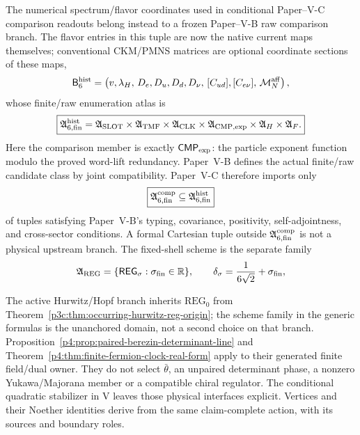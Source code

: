 \documentclass[12pt,a4paper]{article}
\newcommand{\REGsig}{\mathsf{REG}_{\sigma}}
\newcommand{\Brawsix}{\mathsf B_{6}^{\rm hist}}
\newcommand{\Arawsix}{\mathfrak A_{6,{\rm fin}}^{\rm hist}}
\newcommand{\Acompsix}{\mathfrak A_{6,{\rm fin}}^{\rm comp}}
\newcommand{\CMPexp}{\mathsf{CMP}_{\rm exp}}
\begin{document}
The numerical spectrum/flavor coordinates used in conditional Paper--V-C comparison readouts
belong instead to a frozen Paper--V-B raw comparison branch.  The flavor entries in this tuple are now the native current maps themselves; conventional CKM/PMNS matrices are optional coordinate sections of these maps,
\begin{equation}
\label{p7v2:eq:upstream-raw-branch}
\Brawsix
=
\left(
 v,\lambda_H,\,
 D_e,D_u,D_d,D_\nu,\,
 [C_{ud}],[C_{e\nu}],\,
 \mathcal M_N^{\rm aff}
\right),
\end{equation}
whose finite/raw enumeration atlas is
\begin{equation}
\label{p7v2:eq:paper6-selector-atlas}
\boxed{
\Arawsix
=
\mathfrak A_{\rm SLOT}
\times\mathfrak A_{\rm TMF}
\times\mathfrak A_{\rm CLK}
\times\mathfrak A_{\mathrm{CMP,exp}}
\times\mathfrak A_H
\times\mathfrak A_F.
}
\end{equation}
Here the comparison member is exactly \(\CMPexp\): the particle exponent
function modulo the proved word-lift redundancy.  Paper~V-B defines the actual
finite/raw candidate class by joint compatibility.  Paper~V-C therefore
imports only
\begin{equation}
\boxed{\Acompsix\subseteq\Arawsix}
\end{equation}
of tuples satisfying Paper~V-B's typing, covariance, positivity,
self-adjointness, and cross-sector conditions.  A formal Cartesian tuple
outside \(\Acompsix\) is not a physical upstream branch.  The fixed-shell
scheme is the separate family
\begin{equation}
\label{p7v2:eq:reg-family-import}
\mathfrak A_{\rm REG}
=
\{\REGsig:\sigma_{\rm fin}\in\mathbb R\},
\qquad
\delta_\sigma
=
\frac1{6\sqrt2}+\sigma_{\rm fin},
\end{equation}

\begin{remark}
\label{p7:rem:m8-batch-interaction-inputs}
The active Hurwitz/Hopf branch inherits \(\mathrm{REG}_0\)
from Theorem~\ref{p3c:thm:occurring-hurwitz-reg-origin};
the scheme family in the generic formulas is the unanchored
domain, not a second choice on that branch.
Proposition~\ref{p4:prop:paired-berezin-determinant-line}
and Theorem~\ref{p4:thm:finite-fermion-clock-real-form}
apply to their generated finite field/dual owner.
They do not select \(\bar\theta\), an unpaired determinant
phase, a nonzero Yukawa/Majorana member or a compatible
chiral regulator.  The conditional quadratic stabilizer
in V leaves those physical interfaces explicit.
Vertices and their Noether identities derive from the same
claim-complete action, with its sources and boundary roles.
\end{remark}
\end{document}
